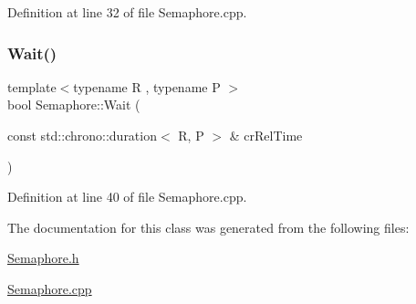 Definition at line 32 of file Semaphore.\+cpp.

\mbox{\label{class_semaphore_a7f700173ae86ae623684109066e07656}} 
\subsubsection{\texorpdfstring{Wait()}{Wait()}\hspace{0.1cm}{\footnotesize\ttfamily [2/2]}}
{\footnotesize\ttfamily template$<$typename R , typename P $>$ \\
bool Semaphore\+::\+Wait (\begin{DoxyParamCaption}\item[{const std\+::chrono\+::duration$<$ R, P $>$ \&}]{cr\+Rel\+Time }\end{DoxyParamCaption})}



Definition at line 40 of file Semaphore.\+cpp.



The documentation for this class was generated from the following files\+:\begin{DoxyCompactItemize}
\item 
\hyperlink{_semaphore_8h}{Semaphore.\+h}\item 
\hyperlink{_semaphore_8cpp}{Semaphore.\+cpp}\end{DoxyCompactItemize}
